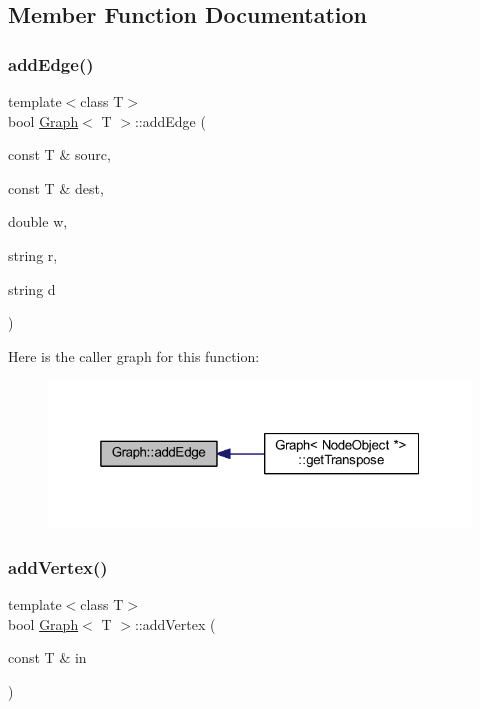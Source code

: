 \subsection{Member Function Documentation}
\mbox{\label{class_graph_ad7d2d102d0b5e91345d69766e1adcd19}} 
\subsubsection{\texorpdfstring{add\+Edge()}{addEdge()}}
{\footnotesize\ttfamily template$<$class T$>$ \\
bool \hyperlink{class_graph}{Graph}$<$ T $>$\+::add\+Edge (\begin{DoxyParamCaption}\item[{const T \&}]{sourc,  }\item[{const T \&}]{dest,  }\item[{double}]{w,  }\item[{string}]{r,  }\item[{string}]{d }\end{DoxyParamCaption})}

Here is the caller graph for this function\+:
\nopagebreak
\begin{figure}[H]
\begin{center}
\leavevmode
\includegraphics[width=319pt]{class_graph_ad7d2d102d0b5e91345d69766e1adcd19_icgraph}
\end{center}
\end{figure}
\mbox{\label{class_graph_a00be284ea2be3b3d0f0d2e493b70245b}} 
\subsubsection{\texorpdfstring{add\+Vertex()}{addVertex()}}
{\footnotesize\ttfamily template$<$class T$>$ \\
bool \hyperlink{class_graph}{Graph}$<$ T $>$\+::add\+Vertex (\begin{DoxyParamCaption}\item[{const T \&}]{in }\end{DoxyParamCaption})}

